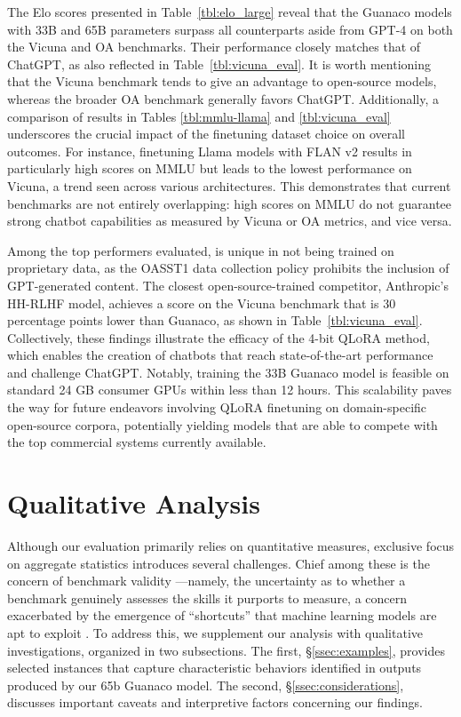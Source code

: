 The Elo scores presented in Table~\ref{tbl:elo_large} reveal that the {Guanaco} models with 33B and 65B parameters surpass all counterparts aside from GPT-4 on both the Vicuna and OA benchmarks. Their performance closely matches that of ChatGPT, as also reflected in Table~\ref{tbl:vicuna_eval}. It is worth mentioning that the Vicuna benchmark tends to give an advantage to open-source models, whereas the broader OA benchmark generally favors ChatGPT. Additionally, a comparison of results in Tables \ref{tbl:mmlu-llama} and \ref{tbl:vicuna_eval} underscores the crucial impact of the finetuning dataset choice on overall outcomes. For instance, finetuning Llama models with FLAN v2 results in particularly high scores on MMLU but leads to the lowest performance on Vicuna, a trend seen across various architectures. This demonstrates that current benchmarks are not entirely overlapping: high scores on MMLU do not guarantee strong chatbot capabilities as measured by Vicuna or OA metrics, and vice versa.

Among the top performers evaluated,  is unique in not being trained on proprietary data, as the OASST1 data collection policy prohibits the inclusion of GPT-generated content. The closest open-source-trained competitor, Anthropic’s HH-RLHF model, achieves a score on the Vicuna benchmark that is 30 percentage points lower than {Guanaco}, as shown in Table~\ref{tbl:vicuna_eval}. Collectively, these findings illustrate the efficacy of the 4-bit \textsc{QLoRA} method, which enables the creation of chatbots that reach state-of-the-art performance and challenge ChatGPT. Notably, training the 33B {Guanaco} model is feasible on standard 24 GB consumer GPUs within less than 12 hours. This scalability paves the way for future endeavors involving \textsc{QLoRA} finetuning on domain-specific open-source corpora, potentially yielding models that are able to compete with the top commercial systems currently available.

\section{Qualitative Analysis}

Although our evaluation primarily relies on quantitative measures, exclusive focus on aggregate statistics introduces several challenges. Chief among these is the concern of benchmark validity \citep{liao2021we}—namely, the uncertainty as to whether a benchmark genuinely assesses the skills it purports to measure, a concern exacerbated by the emergence of ``shortcuts'' that machine learning models are apt to exploit \citep{gururangan2018annotation, poliak2018hypothesis}. To address this, we supplement our analysis with qualitative investigations, organized in two subsections. The first, \S\ref{ssec:examples}, provides selected instances that capture characteristic behaviors identified in outputs produced by our 65b {Guanaco} model. The second, \S\ref{ssec:considerations}, discusses important caveats and interpretive factors concerning our findings.

